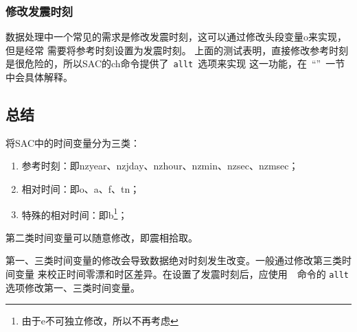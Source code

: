 \subsubsection{修改发震时刻}
数据处理中一个常见的需求是修改发震时刻，这可以通过修改头段变量o来实现，但是经常
需要将参考时刻设置为发震时刻。
上面的测试表明，直接修改参考时刻是很危险的，所以SAC的ch命令提供了~\verb+allt+~选项来实现
这一功能，在~``''~一节中会具体解释。

\subsection{总结}
将SAC中的时间变量分为三类：
\begin{enumerate}
\item 参考时刻：即nzyear、nzjday、nzhour、nzmin、nzsec、nzmsec；
\item 相对时间：即o、a、f、tn；
\item 特殊的相对时间：即b\footnote{由于e不可独立修改，所以不再考虑}；
\end{enumerate}

第二类时间变量可以随意修改，即震相拾取。

第一、三类时间变量的修改会导致数据绝对时刻发生改变。一般通过修改第三类时间变量
来校正时间零漂和时区差异。在设置了发震时刻后，应使用~~命令的
\verb+allt+选项修改第一、三类时间变量。
